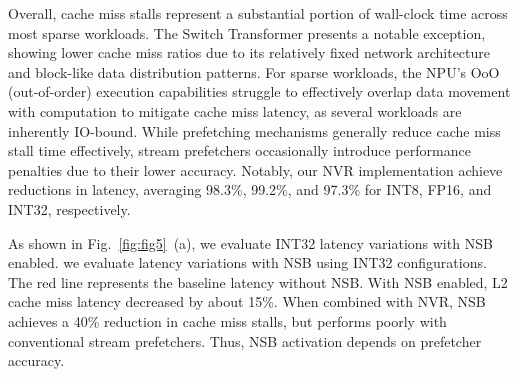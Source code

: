 
Overall, cache miss stalls represent a substantial portion of wall-clock time across most sparse workloads. 
The Switch Transformer presents a notable exception, showing lower cache miss ratios due to its relatively fixed network architecture and block-like data distribution patterns.
For sparse workloads, the NPU's OoO (out-of-order) execution capabilities struggle to effectively overlap data movement with computation to mitigate cache miss latency, as several workloads are inherently IO-bound. 
While prefetching mechanisms generally reduce cache miss stall time effectively, stream prefetchers occasionally introduce performance penalties due to their lower accuracy. 
Notably, our NVR implementation achieve reductions in latency, averaging 98.3\%, 99.2\%, and 97.3\% for INT8, FP16, and INT32, respectively.

As shown in Fig.~\ref{fig:fig5}~(a),  we evaluate INT32 latency variations with NSB enabled. we evaluate latency variations with NSB using INT32 configurations. The red line represents the baseline latency without NSB. 
With NSB enabled, L2 cache miss latency decreased by about 15\%. 
When combined with NVR, NSB achieves a 40\% reduction in cache miss stalls, but performs poorly with conventional stream prefetchers. Thus, NSB activation depends on prefetcher accuracy.







